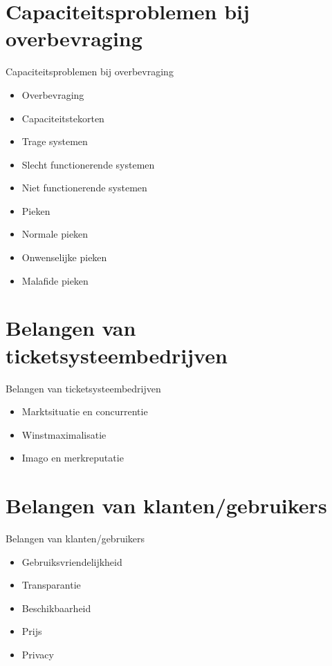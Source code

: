 \documentclass{beamer}
\begin{document}
\section{Capaciteitsproblemen bij overbevraging}
\begin{frame}{Capaciteitsproblemen bij overbevraging}
    \begin{itemize}
        \item Overbevraging
        \item Capaciteitstekorten
        \item Trage systemen
        \item Slecht functionerende systemen
        \item Niet functionerende systemen
        \item Pieken
        \item Normale pieken
        \item Onwenselijke pieken
        \item Malafide pieken
    \end{itemize}
\end{frame}

\section{Belangen van ticketsysteembedrijven}
\begin{frame}{Belangen van ticketsysteembedrijven}
    \begin{itemize}
        \item Marktsituatie en concurrentie
        \item Winstmaximalisatie
        \item Imago en merkreputatie
    \end{itemize}
\end{frame}

\subsection{}

\section{Belangen van klanten/gebruikers}
\begin{frame}{Belangen van klanten/gebruikers}
    \begin{itemize}
        \item Gebruiksvriendelijkheid
        \item Transparantie
        \item Beschikbaarheid
        \item Prijs
        \item Privacy
    \end{itemize}
\end{frame}
    
\end{document}
